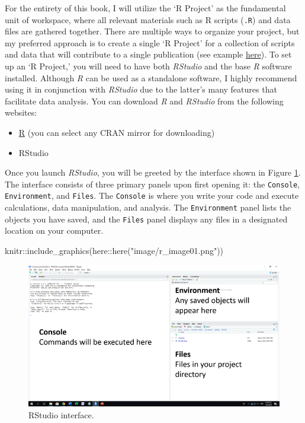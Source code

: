 \documentclass[
]{book}
\newenvironment{Shaded}{\begin{snugshade}}{\end{snugshade}}
\newcommand{\FunctionTok}[1]{\textcolor[rgb]{0.00,0.00,0.00}{#1}}
\newcommand{\NormalTok}[1]{#1}
\newcommand{\SpecialCharTok}[1]{\textcolor[rgb]{0.00,0.00,0.00}{#1}}
\newcommand{\StringTok}[1]{\textcolor[rgb]{0.31,0.60,0.02}{#1}}
\providecommand{\tightlist}{%
  \setlength{\itemsep}{0pt}\setlength{\parskip}{0pt}}
\begin{document}
For the entirety of this book, I will utilize the `R Project' as the fundamental unit of workspace, where all relevant materials such as R scripts (\texttt{.R}) and data files are gathered together. There are multiple ways to organize your project, but my preferred approach is to create a single `R Project' for a collection of scripts and data that will contribute to a single publication (see example \href{https://github.com/aterui/public-proj_stream-diversity}{here}). To set up an `R Project,' you will need to have both \emph{RStudio} and the base \emph{R} software installed. Although \emph{R} can be used as a standalone software, I highly recommend using it in conjunction with \emph{RStudio} due to the latter's many features that facilitate data analysis. You can download \emph{R} and \emph{RStudio} from the following websites:

\begin{itemize}
\tightlist
\item
  \href{https://www.r-project.org/}{R} (you can select any CRAN mirror for downloading)
\item
  RStudio
\end{itemize}

Once you launch \emph{RStudio}, you will be greeted by the interface shown in Figure \ref{fig:ui}. The interface consists of three primary panels upon first opening it: the \texttt{Console}, \texttt{Environment}, and \texttt{Files}. The \texttt{Console} is where you write your code and execute calculations, data manipulation, and analysis. The \texttt{Environment} panel lists the objects you have saved, and the \texttt{Files} panel displays any files in a designated location on your computer.

\begin{Shaded}
\begin{Highlighting}[]
\NormalTok{knitr}\SpecialCharTok{::}\FunctionTok{include\_graphics}\NormalTok{(here}\SpecialCharTok{::}\FunctionTok{here}\NormalTok{(}\StringTok{"image/r\_image01.png"}\NormalTok{))}
\end{Highlighting}
\end{Shaded}

\begin{figure}

{\centering \includegraphics[width=9.47in]{image/r_image01} 

}

\caption{RStudio interface.}\label{fig:ui}
\end{figure}
\end{document}
